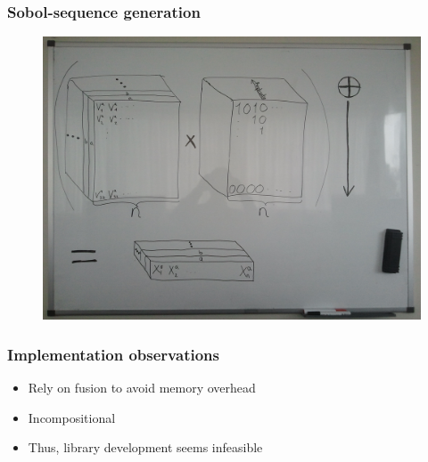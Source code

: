 \documentclass{beamer}
\newcommand{\blor}{\mathbin{
  \raisebox{.1ex}{%
    \rotatebox[origin=c]{90}{\usefont{U}{matha}{m}{n}\symbol{\string"CE}}}}}
\begin{document}
\begin{frame}
  \frametitle{Sobol-sequence generation}
   \begin{figure}
       \centering
       \includegraphics[width=\textwidth]{graphics/whiteboard.jpg}
       \vspace{-5mm}
       \caption{}
   \label{fig:whiteboard}
 \end{figure}  
\end{frame}


\begin{frame}[fragile]
  \frametitle{Implementation observations}

  \begin{itemize}
  \item<1-> Rely on fusion to avoid memory overhead
  \item<2-> Incompositional
  \item<3-> Thus, library development seems infeasible
  \end{itemize}
\end{frame}

\end{document}
